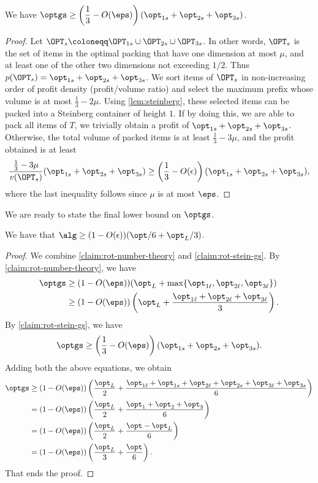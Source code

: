 \begin{claim}
    \label{claim:rot-stein-gs}
    We have $\displaystyle \optgs\ge \left(\frac13-O(\eps)\right)(\opt_{1s}+\opt_{2s}+\opt_{3s})$.
\end{claim}
\begin{proof}
    Let $\OPT_s\coloneqq \OPT_{1s}\cup \OPT_{2s}\cup\OPT_{3s}$. In other words, $\OPT_s$ is the set of items in the optimal packing that have one dimension at most
$\mu$, and at least one of the other two dimensions not exceeding $1/2$. Thus $p(\OPT_s) = \opt_{1s}+\opt_{2s}+\opt_{3s}$. We sort items of $\OPT_s$ in non-increasing order
of profit density (profit/volume ratio) and select the maximum prefix whose volume is at most $\frac{1}{3}-2\mu$. Using \cref{lem:steinberg}, these selected items can be packed into a 
Steinberg container of height $1$. If by doing this, we are able to pack all items of $T$, we trivially obtain a profit of 
$\opt_{1s}+\opt_{2s}+\opt_{3s}$. Otherwise, the total volume of packed items is at least $\frac{1}{3}-3\mu$, and the profit obtained is at least 
\begin{align*}
    \frac{\frac{1}{3}-3\mu}{v(\OPT_s)}(\opt_{1s}+\opt_{2s}+\opt_{3s}) \ge \left(\frac{1}{3}-O(\epsilon)\right)(\opt_{1s}+\opt_{2s}+\opt_{3s}),
\end{align*}
where the last inequality follows since $\mu$ is at most $\eps$.
\end{proof}
We are ready to state the final lower bound on $\optgs$.
\begin{lemma}
\label{lem:containerrotation}
    We have that $\alg \ge (1-O(\epsilon))({\opt}/{6}+{\opt_L}/{3})$.
\end{lemma}
\begin{proof}
    We combine \cref{claim:rot-number-theory} and \cref{claim:rot-stein-gs}. By \cref{claim:rot-number-theory}, we have
    \begin{align*}
        \optgs&\ge (1-O(\eps))(\opt_L+\max\{\opt_{1\ell},\opt_{2\ell},\opt_{3\ell}\})\\
                &\ge (1-O(\eps))\left(\opt_L+\frac{\opt_{1\ell}+\opt_{2\ell}+\opt_{3\ell}}{3}\right).
    \end{align*}
    By \cref{claim:rot-stein-gs}, we have
    \begin{align*}
        \optgs\ge \left(\frac13-O(\eps)\right)(\opt_{1s}+\opt_{2s}+\opt_{3s}).
    \end{align*}
    Adding both the above equations, we obtain
    \begin{align*}
        \optgs&\ge(1-O(\eps))\left(\frac{\opt_L}{2}+\frac{\opt_{1\ell}+\opt_{1s}+\opt_{2\ell}+\opt_{2s}+\opt_{3\ell}+\opt_{3s}}{6}\right)\\
                &=(1-O(\eps))\left(\frac{\opt_L}{2}+\frac{\opt_1+\opt_2+\opt_3}{6}\right)\\
                &=(1-O(\eps))\left(\frac{\opt_L}{2}+\frac{\opt-\opt_L}{6}\right)\\
                &=(1-O(\eps))\left(\frac{\opt_L}{3}+\frac{\opt}{6}\right).
    \end{align*}    
    That ends the proof.
\end{proof}
